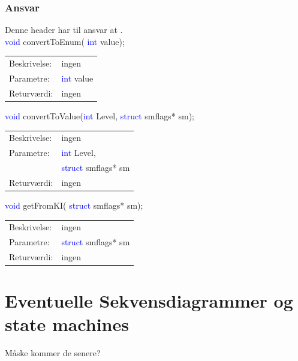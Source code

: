 \subsubsection{Ansvar}
Denne header har til ansvar at .\\
\textcolor{blue}{void} convertToEnum( \textcolor{blue}{int} value); 
\begin{table}[H]
\begin{tabular}{l p{12.5cm}}
\hline
Beskrivelse:& ingen\\
Parametre:&\textcolor{blue}{int} value\\
Returværdi:&ingen\\
\end{tabular}
\end{table}
\textcolor{blue}{void} convertToValue(\textcolor{blue}{int} Level,   \textcolor{blue}{struct} smflags* sm); 
\begin{table}[H]
\begin{tabular}{l p{12.5cm}}
\hline
Beskrivelse:& ingen\\
Parametre:&\textcolor{blue}{int} Level,\\
 &\textcolor{blue}{struct} smflags* sm\\
Returværdi:&ingen\\
\end{tabular}
\end{table}
\textcolor{blue}{void} getFromKI( \textcolor{blue}{struct} smflags* sm); 
\begin{table}[H]
\begin{tabular}{l p{12.5cm}}
\hline
Beskrivelse:& ingen\\
Parametre:&\textcolor{blue}{struct} smflags* sm\\
Returværdi:&ingen\\
\end{tabular}
\end{table}

\section{Eventuelle Sekvensdiagrammer og state machines}
Måske kommer de senere?